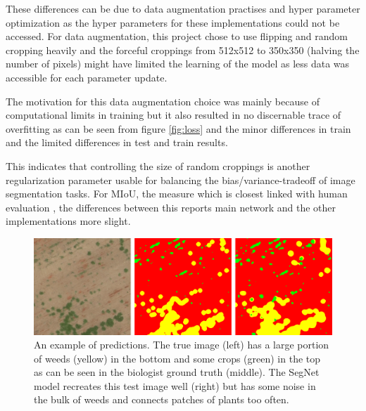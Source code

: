 \documentclass{article}
\begin{document}
These differences can be due to data augmentation practises and hyper parameter optimization as the hyper parameters for these implementations could not be accessed.
For data augmentation, this project chose to use flipping and random cropping heavily and the forceful croppings from 512x512 to 350x350 (halving the number of pixels) might have limited the learning of the model as less data was accessible for each parameter update. 

The motivation for this data augmentation choice was mainly because of computational limits in training but it also resulted in no discernable trace of overfitting as can be seen from figure \eqref{fig:loss} and the minor differences in train and the limited differences in test and train results.

This indicates that controlling the size of random croppings is another regularization parameter usable for balancing the bias/variance-tradeoff of image segmentation tasks. For MIoU, the measure which is closest linked with human evaluation \cite{eval}, the differences between this reports main network and the other implementations more slight. 
\begin{figure}[h!]
	\centering
	\includegraphics[width=\linewidth]{../../poster/reconst}
	\caption{An example of predictions. The true image (left) has a large portion of weeds (yellow) in the bottom and some crops (green) in the top as can be seen in the biologist ground truth (middle). The SegNet model recreates this test image well (right) but has some noise in the bulk of weeds and connects patches of plants too often. }
	\label{fig:reconst}
\end{figure}
\end{document}
